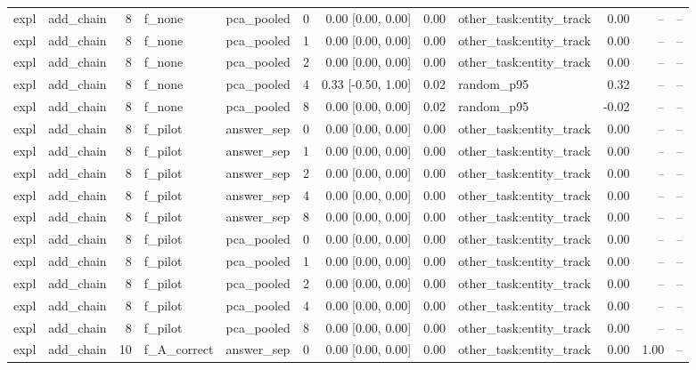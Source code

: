 \begin{tabular}{llrllrrrlrrr}
expl & add\_chain & 8 & f\_none & pca\_pooled & 0 & 0.00 [0.00, 0.00] & 0.00 & other\_task:entity\_track & 0.00 & -- & -- \\
expl & add\_chain & 8 & f\_none & pca\_pooled & 1 & 0.00 [0.00, 0.00] & 0.00 & other\_task:entity\_track & 0.00 & -- & -- \\
expl & add\_chain & 8 & f\_none & pca\_pooled & 2 & 0.00 [0.00, 0.00] & 0.00 & other\_task:entity\_track & 0.00 & -- & -- \\
expl & add\_chain & 8 & f\_none & pca\_pooled & 4 & 0.33 [-0.50, 1.00] & 0.02 & random\_p95 & 0.32 & -- & -- \\
expl & add\_chain & 8 & f\_none & pca\_pooled & 8 & 0.00 [0.00, 0.00] & 0.02 & random\_p95 & -0.02 & -- & -- \\
expl & add\_chain & 8 & f\_pilot & answer\_sep & 0 & 0.00 [0.00, 0.00] & 0.00 & other\_task:entity\_track & 0.00 & -- & -- \\
expl & add\_chain & 8 & f\_pilot & answer\_sep & 1 & 0.00 [0.00, 0.00] & 0.00 & other\_task:entity\_track & 0.00 & -- & -- \\
expl & add\_chain & 8 & f\_pilot & answer\_sep & 2 & 0.00 [0.00, 0.00] & 0.00 & other\_task:entity\_track & 0.00 & -- & -- \\
expl & add\_chain & 8 & f\_pilot & answer\_sep & 4 & 0.00 [0.00, 0.00] & 0.00 & other\_task:entity\_track & 0.00 & -- & -- \\
expl & add\_chain & 8 & f\_pilot & answer\_sep & 8 & 0.00 [0.00, 0.00] & 0.00 & other\_task:entity\_track & 0.00 & -- & -- \\
expl & add\_chain & 8 & f\_pilot & pca\_pooled & 0 & 0.00 [0.00, 0.00] & 0.00 & other\_task:entity\_track & 0.00 & -- & -- \\
expl & add\_chain & 8 & f\_pilot & pca\_pooled & 1 & 0.00 [0.00, 0.00] & 0.00 & other\_task:entity\_track & 0.00 & -- & -- \\
expl & add\_chain & 8 & f\_pilot & pca\_pooled & 2 & 0.00 [0.00, 0.00] & 0.00 & other\_task:entity\_track & 0.00 & -- & -- \\
expl & add\_chain & 8 & f\_pilot & pca\_pooled & 4 & 0.00 [0.00, 0.00] & 0.00 & other\_task:entity\_track & 0.00 & -- & -- \\
expl & add\_chain & 8 & f\_pilot & pca\_pooled & 8 & 0.00 [0.00, 0.00] & 0.00 & other\_task:entity\_track & 0.00 & -- & -- \\
expl & add\_chain & 10 & f\_A\_correct & answer\_sep & 0 & 0.00 [0.00, 0.00] & 0.00 & other\_task:entity\_track & 0.00 & 1.00 & -- \\

\end{tabular}
